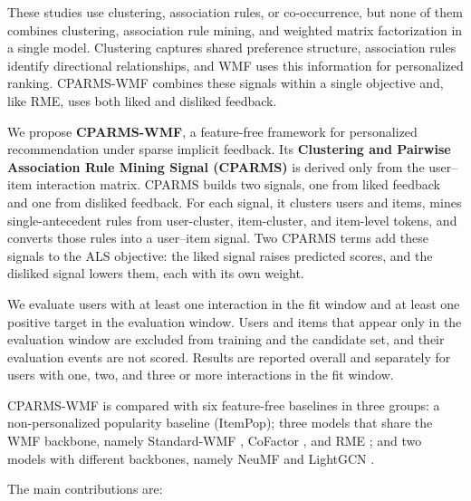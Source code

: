 \documentclass[pdflatex,sn-vancouver-num]{sn-jnl}%
\theoremstyle{thmstyleone}%
\theoremstyle{thmstyletwo}%
\theoremstyle{thmstylethree}%
\begin{document}
These studies use clustering, association rules, or co-occurrence, but none of them combines clustering, association rule mining, and weighted matrix factorization in a single model. Clustering captures shared preference structure, association rules identify directional relationships, and WMF uses this information for personalized ranking. CPARMS-WMF combines these signals within a single objective and, like RME, uses both liked and disliked feedback.

We propose \textbf{CPARMS-WMF}, a feature-free framework for personalized recommendation under sparse implicit feedback. Its \textbf{Clustering and Pairwise Association Rule Mining Signal (CPARMS)} is derived only from the user--item interaction matrix. CPARMS builds two signals, one from liked feedback and one from disliked feedback. For each signal, it clusters users and items, mines single-antecedent rules from user-cluster, item-cluster, and item-level tokens, and converts those rules into a user--item signal. Two CPARMS terms add these signals to the ALS objective: the liked signal raises predicted scores, and the disliked signal lowers them, each with its own weight.

We evaluate users with at least one interaction in the fit window and at least one positive target in the evaluation window. Users and items that appear only in the evaluation window are excluded from training and the candidate set, and their evaluation events are not scored. Results are reported overall and separately for users with one, two, and three or more interactions in the fit window.

CPARMS-WMF is compared with six feature-free baselines in three groups: a non-personalized popularity baseline (ItemPop); three models that share the WMF backbone, namely Standard-WMF \cite{hu2008implicit}, CoFactor \cite{liang2016cofactor}, and RME \cite{tran2018rme}; and two models with different backbones, namely NeuMF \cite{he2017ncf} and LightGCN \cite{he2020lightgcn}.

The main contributions are:
\end{document}
